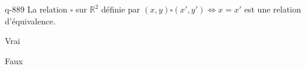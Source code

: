 \begin{truefalse}{q-889}
La relation $\square$ sur $\mathbb R^2$ définie par $(x,y)\square (x',y') \iff x=x'$ est une relation d'équivalence.
\item* Vrai
\item Faux
\end{truefalse}

